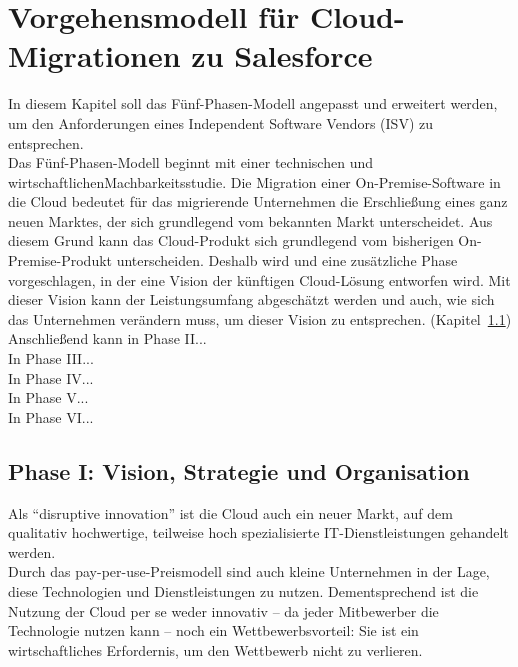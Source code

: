 \section{Vorgehensmodell für Cloud-Migrationen zu Salesforce}
\label{cha:entwickelung_vorgehensmodell}
In diesem Kapitel soll das Fünf-Phasen-Modell angepasst und erweitert werden, 
um den Anforderungen eines Independent Software Vendors (ISV) zu entsprechen. \\

Das Fünf-Phasen-Modell beginnt mit einer technischen und 
wirtschaftlichenMachbarkeitsstudie. Die Migration einer On-Premise-Software in 
die Cloud bedeutet für das migrierende Unternehmen die Erschließung eines ganz 
neuen Marktes, der sich grundlegend vom bekannten Markt unterscheidet. Aus 
diesem Grund kann das Cloud-Produkt sich grundlegend vom bisherigen 
On-Premise-Produkt unterscheiden. Deshalb wird 
 und 
 eine zusätzliche 
Phase vorgeschlagen, in der eine Vision der künftigen Cloud-Lösung entworfen 
wird. Mit dieser Vision kann der Leistungsumfang abgeschätzt werden und auch, 
wie sich das Unternehmen verändern muss, um dieser Vision zu entsprechen. 
(Kapitel~\ref{cha:phaseI})\\

Anschließend kann in Phase II... \\

In Phase III... \\

In Phase IV... \\

In Phase V... \\

In Phase VI... \\

\subsection{Phase I: Vision, Strategie und Organisation}
\label{cha:phaseI}

Als "`disruptive innovation"' ist die Cloud auch ein neuer Markt, auf dem 
qualitativ hochwertige, teilweise hoch spezialisierte IT-Dienstleistungen 
gehandelt werden. 
 \\
Durch das pay-per-use-Preismodell sind auch kleine Unternehmen in der Lage, 
diese Technologien und Dienstleistungen zu nutzen. 
 Dementsprechend ist die Nutzung der Cloud per se 
weder  innovativ -- da jeder Mitbewerber die Technologie nutzen kann -- noch 
ein Wettbewerbsvorteil: Sie ist ein wirtschaftliches Erfordernis, um den 
Wettbewerb nicht zu verlieren. 


